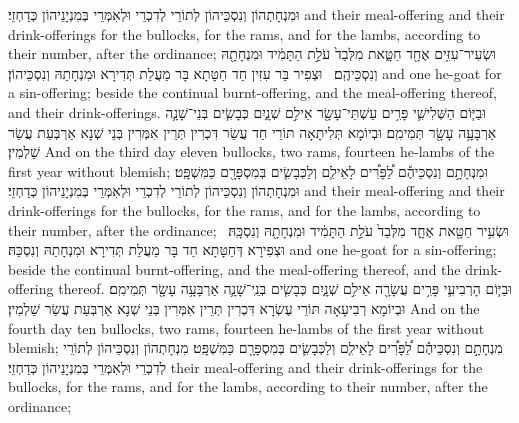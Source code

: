 {וּמִנְחָתְהוֹן וְנִסְכֵּיהוֹן לְתוֹרֵי לְדִכְרֵי וּלְאִמְּרֵי בְּמִנְיָנֵיהוֹן כְּדַחְזֵי׃}
{and their meal-offering and their drink-offerings for the bullocks, for the rams, and for the lambs, according to their number, after the ordinance;}{}
{וּשְׂעִיר־עִזִּ֥ים אֶחָ֖ד חַטָּ֑את מִלְּבַד֙ עֹלַ֣ת הַתָּמִ֔יד וּמִנְחָתָ֖הּ וְנִסְכֵּיהֶֽם׃ \setuma }
{וּצְפִיר בַּר עִזִּין חַד חַטָּתָא בָּר מֵעֲלַת תְּדִירָא וּמִנְחָתַהּ וְנִסְכֵּיהוֹן׃}
{and one he-goat for a sin-offering; beside the continual burnt-offering, and the meal-offering thereof, and their drink-offerings.}{}
{וּבַיּ֧וֹם הַשְּׁלִישִׁ֛י פָּרִ֥ים עַשְׁתֵּי־עָשָׂ֖ר אֵילִ֣ם שְׁנָ֑יִם כְּבָשִׂ֧ים בְּנֵי־שָׁנָ֛ה אַרְבָּעָ֥ה עָשָׂ֖ר תְּמִימִֽם׃}
{וּבְיוֹמָא תְּלִיתָאָה תּוֹרֵי חַד עֲשַׂר דִּכְרִין תְּרֵין אִמְּרִין בְּנֵי שְׁנָא אַרְבְּעַת עֲשַׂר שַׁלְמִין׃}
{And on the third day eleven bullocks, two rams, fourteen he-lambs of the first year without blemish;}{}
{וּמִנְחָתָ֣ם וְנִסְכֵּיהֶ֡ם לַ֠פָּרִ֠ים לָאֵילִ֧ם וְלַכְּבָשִׂ֛ים בְּמִסְפָּרָ֖ם כַּמִּשְׁפָּֽט׃}
{וּמִנְחָתְהוֹן וְנִסְכֵּיהוֹן לְתוֹרֵי לְדִכְרֵי וּלְאִמְּרֵי בְּמִנְיָנֵיהוֹן כְּדַחְזֵי׃}
{and their meal-offering and their drink-offerings for the bullocks, for the rams, and for the lambs, according to their number, after the ordinance;}{}
{וּשְׂעִ֥יר חַטָּ֖את אֶחָ֑ד מִלְּבַד֙ עֹלַ֣ת הַתָּמִ֔יד וּמִנְחָתָ֖הּ וְנִסְכָּֽהּ׃ \setuma }
{וּצְפִירָא דְּחַטָּתָא חַד בָּר מֵעֲלַת תְּדִירָא וּמִנְחָתַהּ וְנִסְכַּהּ׃}
{and one he-goat for a sin-offering; beside the continual burnt-offering, and the meal-offering thereof, and the drink-offering thereof.}{}
{וּבַיּ֧וֹם הָרְבִיעִ֛י פָּרִ֥ים עֲשָׂרָ֖ה אֵילִ֣ם שְׁנָ֑יִם כְּבָשִׂ֧ים בְּנֵֽי־שָׁנָ֛ה אַרְבָּעָ֥ה עָשָׂ֖ר תְּמִימִֽם׃}
{וּבְיוֹמָא רְבִיעָאָה תּוֹרֵי עֶשְׂרָא דִּכְרִין תְּרֵין אִמְּרִין בְּנֵי שְׁנָא אַרְבְּעַת עֲשַׂר שַׁלְמִין׃}
{And on the fourth day ten bullocks, two rams, fourteen he-lambs of the first year without blemish;}{}
{מִנְחָתָ֣ם וְנִסְכֵּיהֶ֡ם לַ֠פָּרִ֠ים לָאֵילִ֧ם וְלַכְּבָשִׂ֛ים בְּמִסְפָּרָ֖ם כַּמִּשְׁפָּֽט׃}
{מִנְחָתְהוֹן וְנִסְכֵּיהוֹן לְתוֹרֵי לְדִכְרֵי וּלְאִמְּרֵי בְּמִנְיָנֵיהוֹן כְּדַחְזֵי׃}
{their meal-offering and their drink-offerings for the bullocks, for the rams, and for the lambs, according to their number, after the ordinance;}{}
